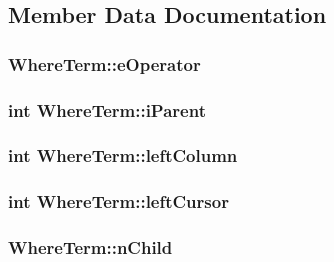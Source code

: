 \subsection{Member Data Documentation}
\hypertarget{struct_where_term_af0b4817bee491fa1ee69a87d8ff580c5}{
\subsubsection[{e\-Operator}]{ Where\-Term\-::e\-Operator}}\label{struct_where_term_af0b4817bee491fa1ee69a87d8ff580c5}
\hypertarget{struct_where_term_aa45e0b271713e429fbeba433941d2e22}{
\subsubsection[{i\-Parent}]{\setlength{\rightskip}{0pt plus 5cm}int Where\-Term\-::i\-Parent}}\label{struct_where_term_aa45e0b271713e429fbeba433941d2e22}
\hypertarget{struct_where_term_a1f6e520bd34633ebb6001cd0c39eef21}{
\subsubsection[{left\-Column}]{\setlength{\rightskip}{0pt plus 5cm}int Where\-Term\-::left\-Column}}\label{struct_where_term_a1f6e520bd34633ebb6001cd0c39eef21}
\hypertarget{struct_where_term_a82bb97ef4285d75b1b9c4fcd2025aaf7}{
\subsubsection[{left\-Cursor}]{\setlength{\rightskip}{0pt plus 5cm}int Where\-Term\-::left\-Cursor}}\label{struct_where_term_a82bb97ef4285d75b1b9c4fcd2025aaf7}
\hypertarget{struct_where_term_af83cf7bae7760b9b1ca398338a35c32a}{
\subsubsection[{n\-Child}]{ Where\-Term\-::n\-Child}}\label{struct_where_term_af83cf7bae7760b9b1ca398338a35c32a}
